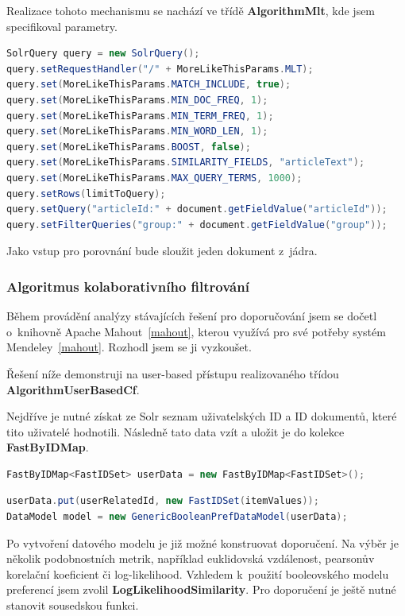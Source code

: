 \documentclass[thesis=M,czech]{FITthesis}[2014/05/07]
\begin{document}
Realizace tohoto mechanismu se nachází ve třídě \textbf{AlgorithmMlt}, kde jsem specifikoval parametry. 

\begin{lstlisting}[language=java]
SolrQuery query = new SolrQuery();
query.setRequestHandler("/" + MoreLikeThisParams.MLT);
query.set(MoreLikeThisParams.MATCH_INCLUDE, true);
query.set(MoreLikeThisParams.MIN_DOC_FREQ, 1);
query.set(MoreLikeThisParams.MIN_TERM_FREQ, 1);
query.set(MoreLikeThisParams.MIN_WORD_LEN, 1);
query.set(MoreLikeThisParams.BOOST, false);
query.set(MoreLikeThisParams.SIMILARITY_FIELDS, "articleText");
query.set(MoreLikeThisParams.MAX_QUERY_TERMS, 1000);
query.setRows(limitToQuery);
query.setQuery("articleId:" + document.getFieldValue("articleId"));
query.setFilterQueries("group:" + document.getFieldValue("group"));
\end{lstlisting}

Jako vstup pro porovnání bude sloužit jeden dokument z~jádra.

\subsubsection{Algoritmus kolaborativního filtrování}
Během provádění analýzy stávajících řešení pro doporučování jsem se dočetl o~knihovně Apache Mahout~\ref{mahout}, kterou využívá pro své potřeby systém Mendeley~\ref{mahout}. Rozhodl jsem se ji vyzkoušet.

Řešení níže demonstruji na user-based přístupu realizovaného třídou \textbf{AlgorithmUserBasedCf}.

Nejdříve je nutné získat ze Solr seznam uživatelských ID a ID dokumentů, které tito uživatelé hodnotili. Následně tato data vzít a uložit je do kolekce \textbf{FastByIDMap}.

\begin{lstlisting}[language=java]
FastByIDMap<FastIDSet> userData = new FastByIDMap<FastIDSet>();
\end{lstlisting}

\begin{lstlisting}[language=java]
userData.put(userRelatedId, new FastIDSet(itemValues));
DataModel model = new GenericBooleanPrefDataModel(userData);
\end{lstlisting}

Po vytvoření datového modelu je již možné konstruovat doporučení. Na výběr je několik podobnostních metrik, například euklidovská vzdálenost, pearsonův korelační koeficient či log-likelihood. Vzhledem k~použití booleovského modelu preferencí jsem zvolil \textbf{LogLikelihoodSimilarity}. Pro doporučení je ještě nutné stanovit sousedskou funkci.
\end{document}
